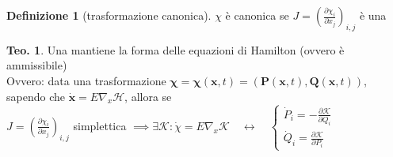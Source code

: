 \documentclass[a4paper,10pt]{article}
\theoremstyle{definition}
\newcommand{\bv}{\boldsymbol} %
\theoremstyle{indentdefinition}
\newtheorem{defn}{Definizione}[section]
\theoremstyle{indenttheorem}
\newtheorem{thm}{Teo.}
\theoremstyle{myremark}
\theoremstyle{indentgeneral}
\newenvironment{myboxed} 
{\noindent\begin{lrbox}{\mybox}\begin{minipage}{\textwidth}}
{\end{minipage}\end{lrbox}\fbox{\usebox{\mybox}}}
\begin{document}
\begin{defn}[trasformazione canonica]
\label{def:trasformazione-canonica}$\chi$ è canonica se $J=\left(\frac{\partial\chi_{i}}{\partial x_{j}}\right)_{i,j}$
è una 
\end{defn}

\begin{myboxed}
\begin{thm}
Una  mantiene la forma delle
equazioni di Hamilton (ovvero è ammissibile) \\
Ovvero: data una trasformazione $\bv{\chi} =\bv{\chi}\left(\bv{x},t\right)=(\bv{P}(\bv{x},t),\bv{Q}(\bv{x},t))$, sapendo che $\dot{\bv{x}}=E\nabla_{x}\mathcal{H}$, allora se \\
$J=\left(\frac{\partial\chi_{i}}{\partial x_{j}}\right)_{i,j}$ simplettica $\implies\exists\mathcal{K}: \dot{\chi}=E\nabla_{x}\mathcal{K}\quad\longleftrightarrow  \quad 
\begin{cases}
\dot{P}_{i}=-\frac{\partial\mathcal{K}}{\partial Q_{i}}\\
\dot{Q}_{i}=\frac{\partial\mathcal{K}}{\partial P_{i}}
\end{cases}$
\end{thm}
\end{myboxed}
\end{document}
